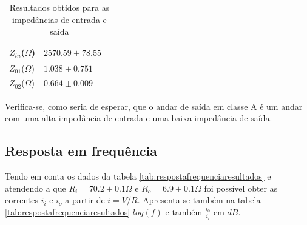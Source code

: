 \documentclass[%
  reprint,
  nofootinbib,
  amsmath,amssymb,
  aps,
  10pt,
  a4paper
]{revtex4-1}
\begin{document}
\begin{table}[h]
    \begin{tabular}{|l|l|l|}
    \hline
    $Z_{in}$($\Omega$) & $2570.59 \pm 78.55$ \\ \hline
    $Z_{01}$($\Omega$) & $1.038\pm 0.751$  \\ \hline
    $Z_{02}$($\Omega$) & $0.664\pm0.009$  \\ \hline
    \end{tabular}
\caption{Resultados obtidos para as impedâncias de entrada e saída}
\label{tab:analiseimpedancias}
\end{table}

Verifica-se, como seria de esperar, que o andar de saída em classe A é um andar com uma alta impedância de entrada e uma baixa impedância de saída.


\subsection{Resposta em frequência}
Tendo em conta os dados da tabela \ref{tab:respostafrequenciaresultados} e atendendo a que $R_i=70.2 \pm 0.1\Omega$ e $R_o=6.9 \pm 0.1\Omega$ foi possível obter as correntes $i_i$ e $i_o$ a partir de $i=V/R$. Apresenta-se também na tabela \ref{tab:respostafrequenciaresultados} $log(f)$ e também $\frac{i_0}{i_i}$ em $dB$. 
\end{document}
